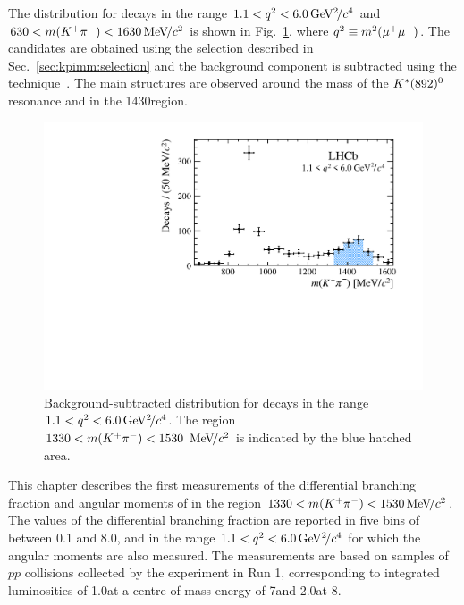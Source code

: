 The \mkpi distribution for \BdToKpimm decays in the range $1.1<{q^2}<6.0{\mathrm{\,Ge\kern -0.1em V^2\!/}c^4}$ and $630<m({{K}^+}{{\pi}^-})<1630{\mathrm{\,Me\kern -0.1em V\!/}c^2}$ is shown in Fig.~\ref{fig:full-mkpi}, where ${q^2} \equiv m^2({\mu^+} {\mu^-})$. The candidates are obtained using the selection described in Sec.~\ref{sec:kpimm:selection} and the background component is subtracted using the \sPlot technique~\cite{splot}. The main structures are observed around the mass of the ${{K}^*}(892)^{0}$ resonance and in the 1430\mevcc region. 

\begin{figure}[!tb]
 \centering
 \includegraphics[width=0.7\linewidth]{figs/kpimm/introduction/full-mkpi.pdf}
 \caption{Background-subtracted \mkpi distribution for \BdToKpimm decays in the range $1.1<{q^2}<6.0{\mathrm{\,Ge\kern -0.1em V^2\!/}c^4}$. The region $1330<m({{K}^+}{{\pi}^-})<1530~{\mathrm{\,Me\kern -0.1em V\!/}c^2}$ is indicated by the blue hatched area.}
\label{fig:full-mkpi}
\end{figure}

This chapter describes the first measurements of the differential branching fraction and angular moments of \BdToKpimm in the region $1330<m({{K}^+}{{\pi}^-})<1530{\mathrm{\,Me\kern -0.1em V\!/}c^2}$. The values of the differential branching fraction are reported in five bins of \qsq between 0.1 and 8.0\gevgevcccc, and in the range $1.1<{q^2}<6.0{\mathrm{\,Ge\kern -0.1em V^2\!/}c^4}$ for which the angular moments are also measured. The measurements are based on samples of $pp$ collisions collected by the \lhcb experiment in Run 1, corresponding to integrated luminosities of 1.0\invfb at a centre-of-mass energy of 7\tev and 2.0\invfb at 8\tev.  